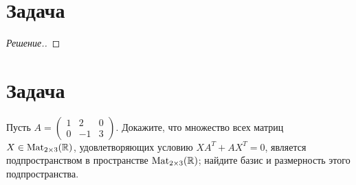 \documentclass[a4paper]{article}
\newcommand{\Mat}{\operatorname{Mat}}
\theoremstyle{remark}
\begin{document}
    \section*{Задача }
	    \begin{proof}[Решение.]
		
      \end{proof}
    
    \section*{Задача }
      Пусть $A = \begin{pmatrix}
        1 & 2 & 0 \\
        0 & -1 & 3
      \end{pmatrix}$. Докажите, что множество всех матриц $X \in \Mat_{2 \times 3}(\RR)$, удовлетворяющих условию $XA^T + AX^T = 0$, является подпространством в пространстве $\Mat_{2 \times 3}(\RR)$; найдите базис и размерность этого подпространства.
\end{document}

